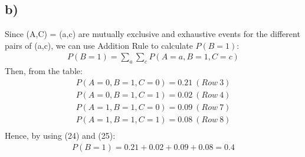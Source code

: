 \documentclass[12pt]{article}
\begin{document}
\subsection*{b)} Since {(A,C) = (a,c)} are mutually exclusive and exhaustive events for the different pairs of (a,c), we can use Addition Rule to calculate $P(B=1)$:
\begin{equation} 
\begin{split}
P(B=1) = \sum_{a}\sum_{c}P(A=a,B=1,C=c)
\end{split}
\end{equation}
Then, from the table:
\begin{equation} 
\begin{split}
P(A=0,B=1,C=0) = 0.21 \ (Row \ 3) \\
P(A=0,B=1,C=1) = 0.02 \ (Row \ 4) \\
P(A=1,B=1,C=0) = 0.09 \ (Row \ 7) \\
P(A=1,B=1,C=1) = 0.08 \ (Row \ 8) \\
\end{split}
\end{equation}
Hence, by using (24) and (25):
\begin{equation*} 
\begin{split}
P(B=1) = 0.21+0.02+0.09+0.08 = 0.4
\end{split}
\end{equation*}
\end{document}
